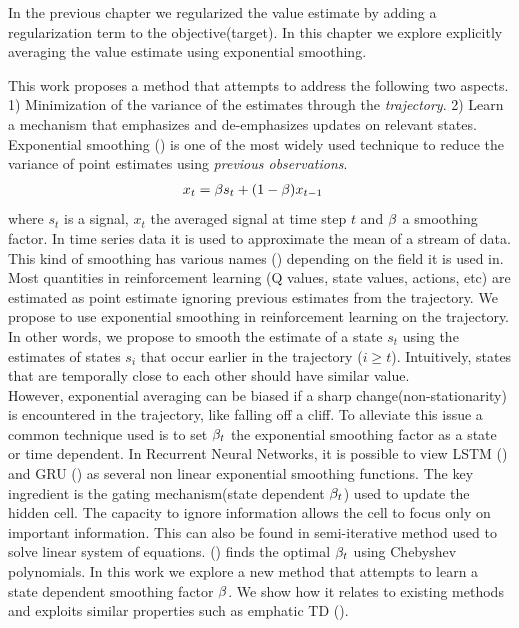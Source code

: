 
In the previous chapter we regularized the value estimate by adding a regularization term to the objective(target). In this chapter we explore explicitly averaging the value estimate using exponential smoothing.


This work proposes a method that attempts to address the following two aspects. 1) Minimization of the variance of the estimates through the \emph{trajectory}. 2) Learn a mechanism that emphasizes and de-emphasizes updates on relevant states.\\
Exponential smoothing (\cite{gardner1985exponential}) is one of the most widely used technique to reduce the variance of point estimates using \emph{previous observations}.
\begin{equation}
\begin{split}\label{smoothing}
    x_t &= \beta s_t + (1-\beta) x_{t-1}
\end{split}
\end{equation}
where $s_t$ is a signal, $x_t$ the averaged signal at time step $t$ and $\beta$ a smoothing factor.
In time series data it is used to approximate the mean of a stream of data. This kind of smoothing has various names (\cite{polyak1992acceleration,kingma2014adam}) depending on the field it is used in.  Most quantities in reinforcement learning (Q values, state values, actions, etc) are estimated as point estimate ignoring previous estimates from the trajectory. We propose to use exponential smoothing in reinforcement learning on the trajectory. In other words, we propose to smooth the estimate of a state $s_t$ using the estimates of states $s_i$ that occur earlier in the trajectory ($i\geq t$). Intuitively, states that are temporally close to each other should have similar value.\\
However, exponential averaging can be biased if a sharp change(non-stationarity) is encountered in the trajectory, like falling off a cliff. To alleviate this issue a common technique used is to set $\beta_t$ the exponential smoothing factor as a state or time dependent. In Recurrent Neural Networks, it is possible to view LSTM (\cite{hochreiter1997long}) and GRU (\cite{chung2014empirical}) as several non linear exponential smoothing functions. The key ingredient is the gating mechanism(state dependent $\beta_t$) used to update the hidden cell. The capacity to ignore information allows the cell to focus only on important information. This can also be found in semi-iterative method used to solve linear system of equations. (\cite{golub1961chebyshev}) finds the optimal $\beta_t$ using Chebyshev polynomials. In this work we explore a new method that attempts to learn a state dependent smoothing factor $\beta$. We show how it relates to existing methods and exploits similar properties such as emphatic TD (\cite{sutton2016emphatic,mahmood2015emphatic}). 

